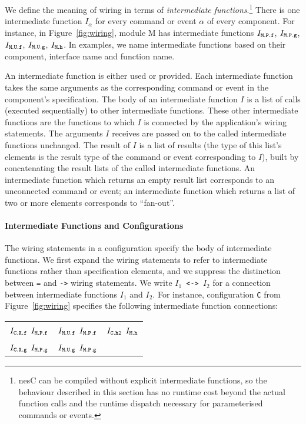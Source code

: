 \documentclass[11pt,letterpaper]{article}
\newcommand{\code}[1]{{\tt #1}}
\newcommand{\nesc}{nesC\xspace}
\begin{document}
We define the meaning of wiring in terms of \emph{intermediate
functions}.\footnote{\nesc can be compiled without explicit intermediate
functions, so the behaviour described in this section has no runtime cost
beyond the actual function calls and the runtime dispatch necessary for
parameterised commands or events.}  There is one intermediate function
$I_\alpha$ for every command or event $\alpha$ of every component. For
instance, in Figure~\ref{fig:wiring}, module M has intermediate functions
$I_\code{M.P.f}$, $I_\code{M.P.g}$, $I_\code{M.U.f}$, $I_\code{M.U.g}$,
$I_\code{M.h}$.  In examples, we name intermediate functions based on their
component, interface name and function name.

An intermediate function is either used or provided. Each intermediate
function takes the same arguments as the corresponding command or
event in the component's specification. The body of an intermediate
function $I$ is a list of calls (executed sequentially) to other
intermediate functions. These other intermediate functions are the
functions to which $I$ is connected by the application's wiring
statements. The arguments $I$ receives are passed on to the called
intermediate functions unchanged. The result of $I$ is a list of
results (the type of this list's elements is the result type of the
command or event corresponding to $I$), built by concatenating the
result lists of the called intermediate functions. An intermediate
function which returns an empty result list corresponds to an
unconnected command or event; an intermediate function which returns a
list of two or more elements corresponds to ``fan-out''.

\paragraph{Intermediate Functions and Configurations}

The wiring statements in a configuration specify the body of intermediate
functions. We first expand the wiring statements to refer to intermediate
functions rather than specification elements, and we suppress the
distinction between \code{=} and \code{->} wiring statements. We write
\code{$I_1$ <-> $I_2$} for a connection between intermediate functions
\code{$I_1$} and \code{$I_2$}. For instance, configuration \code{C} from
Figure~\ref{fig:wiring} specifies the following intermediate function
connections:\\
\begin{tabular}{ccc}
$I_\code{C.X.f}$ \code{<->} $I_\code{M.P.f}$ & 
$I_\code{M.U.f}$ \code{<->} $I_\code{M.P.f}$ & 
$I_\code{C.h2}$ \code{<->} $I_\code{M.h}$ \\
$I_\code{C.X.g}$ \code{<->} $I_\code{M.P.g}$ & 
$I_\code{M.U.g}$ \code{<->} $I_\code{M.P.g}$
\end{tabular}
\end{document}
